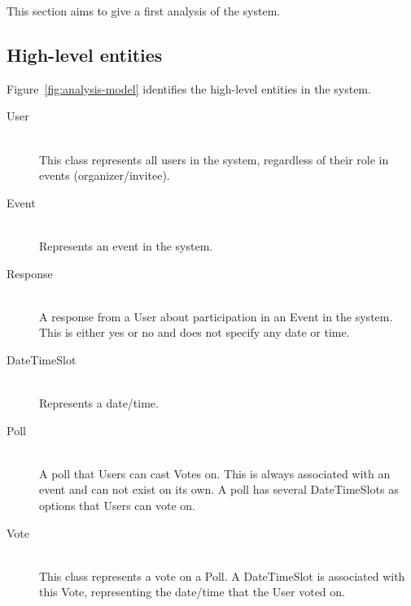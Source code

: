 This section aims to give a first analysis of the system.

\subsection{High-level entities}
	Figure~\ref{fig:analysis-model} identifies the high-level entities in the system.

	\begin{description}
		\item[User] \hfill \\
			This class represents all users in the system, regardless of their role in events (organizer/invitee).
		\item[Event] \hfill \\
			Represents an event in the system.
		\item[Response] \hfill \\
			A response from a User about participation in an Event in the system. This is either yes or no and does not specify any date or time.
		\item[DateTimeSlot] \hfill \\
			Represents a date/time.
		\item[Poll] \hfill \\
			A poll that Users can cast Votes on. This is always associated with an event and can not exist on its own. A poll has several DateTimeSlots as options that Users can vote on.
		\item[Vote] \hfill \\
			This class represents a vote on a Poll. A DateTimeSlot is associated with this Vote, representing the date/time that the User voted on.
			
	\end{description}
	
